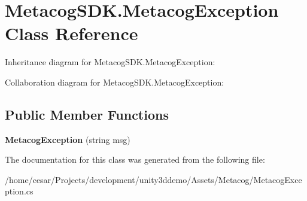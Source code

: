 \hypertarget{classMetacogSDK_1_1MetacogException}{}\section{Metacog\+S\+D\+K.\+Metacog\+Exception Class Reference}
\label{classMetacogSDK_1_1MetacogException}


Inheritance diagram for Metacog\+S\+D\+K.\+Metacog\+Exception\+:


Collaboration diagram for Metacog\+S\+D\+K.\+Metacog\+Exception\+:
\subsection*{Public Member Functions}
\begin{DoxyCompactItemize}
\item 
{\bfseries Metacog\+Exception} (string msg)\hypertarget{classMetacogSDK_1_1MetacogException_a6db0f673579ae18575c2814b97ecc252}{}\label{classMetacogSDK_1_1MetacogException_a6db0f673579ae18575c2814b97ecc252}

\end{DoxyCompactItemize}


The documentation for this class was generated from the following file\+:\begin{DoxyCompactItemize}
\item 
/home/cesar/\+Projects/development/unity3ddemo/\+Assets/\+Metacog/Metacog\+Exception.\+cs\end{DoxyCompactItemize}
